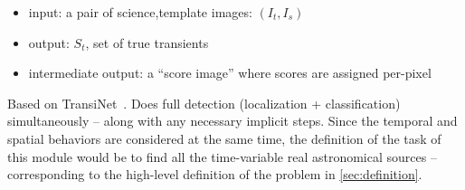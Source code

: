 \begin{itemize}
  \item input: a pair of science,template images: $(I_t,I_s)$
  \item output: $S_t$, set of true transients
  \item intermediate output: a ``score image'' where scores are assigned per-pixel
\end{itemize}

Based on TransiNet~\cite{transinet}. Does full detection (localization + classification) simultaneously -- along with any necessary implicit steps.
Since the temporal and spatial behaviors are considered at the same time, the definition of the task of this module would be to find all the time-variable real astronomical sources -- corresponding to the high-level definition of the problem in \ref{sec:definition}.














